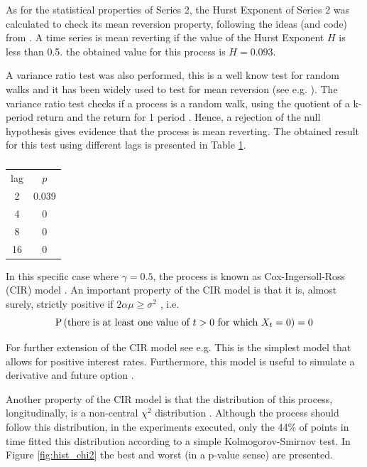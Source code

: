\documentclass[11pt]{article}
\theoremstyle{definition}
\theoremstyle{remark}
\theoremstyle{remark}
\begin{document}
As for the statistical properties of Series 2, the Hurst Exponent of Series 2
was calculated to check its mean reversion property, following the ideas
(and code) from \parencite{quanstart}. A time series is mean reverting if the value
of the Hurst Exponent $H$ is less than 0.5. the obtained value for this process
is $H = 0.093$.

A variance ratio test was also performed, this is a well know test for random
walks \parencite{lo1989size} and it has been widely used to test for mean
reversion (see e.g. \parencite{lo1988stock,risager1998random,lam2006new}).
The variance ratio test checks if a process is a random walk,
using the quotient of a k-period return and the return for 1 period
\parencite{charles2009variance}. Hence, a rejection of the null hypothesis
gives evidence that the process is mean reverting. The obtained result for
this test using different lags is presented in Table \ref{tab:vrt2}.

\begin{table}[H]
  \centering
  \begin{tabular}{cc}
    \hline
    lag & $p$   \\
    2   & 0.039 \\
    4   & 0     \\
    8   & 0     \\
    16  & 0     \\ \hline
  \end{tabular}
  \caption{}
  \label{tab:vrt2}
\end{table}

In this specific case where $\gamma=0.5$, the process is known as
Cox-Ingersoll-Ross (CIR) model \parencite{cox1985}. An important property
of the CIR model is that it is, almost surely, strictly positive
if $2\alpha\mu \ge \sigma^2$ \parencite{cox1985,unknown2017}, i.e.
\begin{equation*}
  \P{\text{there is at least one value of } t > 0 \text{ for which }
    X_t = 0} = 0
\end{equation*}

For further extension of the CIR model see e.g.
\parencite{overbeck1997estimation,mishra2010study,li2015asymptotic,medvedev2019cox}
This is the simplest model that allows for positive interest
rates. Furthermore, this model is useful to simulate a derivative and
future option \parencite{unknown2017}.

Another property of the CIR model is that the distribution of this process,
longitudinally, is a non-central $\chi^2$ distribution
\parencite{dyrting2004}. Although the process should follow this
distribution, in the experiments executed, only the 44\% of points in
time fitted this distribution according to a simple Kolmogorov-Smirnov test.
In Figure \ref{fig:hist_chi2} the best and worst (in a p-value sense) are presented.
\end{document}
